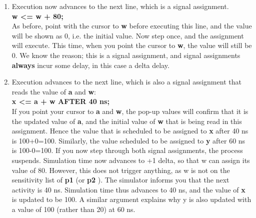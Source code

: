 \documentclass[a4paper,12pt]{article}
\newcommand\tab[1][1cm]{\hspace*{ #1} }
\begin{document}
\begin{enumerate}
\item %
Execution now advances to the next line, which is a signal assignment.
\\
\tab \textbf{w \textless= w + 80;}
\\
As before, point with the cursor to \textbf{w} before executing this line, and the value will be shown as 0, i.e. the initial value. Now step once, and the assignment will execute. This time, when you point the cursor to \textbf{w}, the value will still be 0. We know the reason; this is a signal assignment, and signal assignments \textbf{always} incur some delay, in this case a delta delay.

\item %
Execution advances to the next line, which is also a signal assignment that reads the value of \textbf{a} and \textbf{w}:
\\
\tab \textbf{x <= a + w AFTER 40 ns;}
\\
If you point your cursor to \textbf{a} and \textbf{w}, the pop-up values will confirm that it is the updated value of \textbf{a}, and the initial value of \textbf{w} that is being read in this assignment. Hence the value that is scheduled to be assigned to \textbf{x} after 40 ns is 100+0=100. Similarly, the value scheduled to be assigned to \textbf{y} after 60 ns is 100-0=100. If you now step through both signal assignments, the process suspends. Simulation time now advances to +1 delta, so that w can assign its value of 80. However, this does not trigger anything, as w is not on the sensitivity list of \textbf{p1} (or \textbf{p2} ). The simulator informs you that the next activity is 40 ns. Simulation time thus advances to 40 ns, and the value of \textbf{x} is updated to be 100. A similar argument explains why y is also updated with a value of 100 (rather than 20) at 60 ns.
\\
\\

\clearpage


\end{enumerate}
\end{document}
